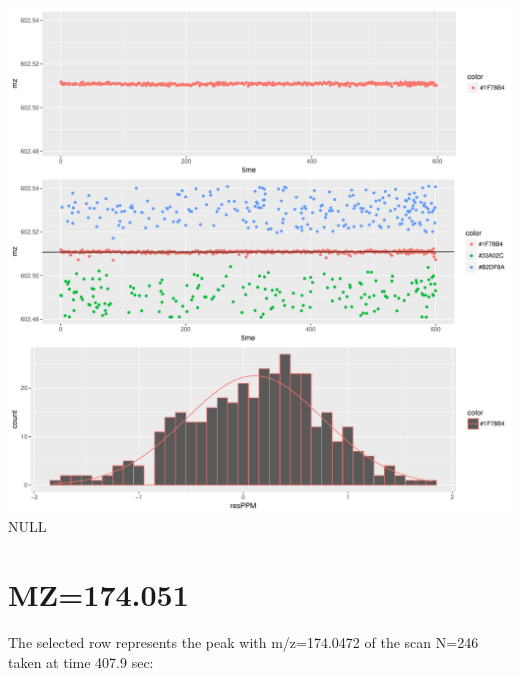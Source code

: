 \documentclass[]{article}
\newenvironment{Shaded}{\begin{snugshade}}{\end{snugshade}}
\newcommand{\KeywordTok}[1]{\textcolor[rgb]{0.13,0.29,0.53}{\textbf{#1}}}
\newcommand{\FloatTok}[1]{\textcolor[rgb]{0.00,0.00,0.81}{#1}}
\newcommand{\OperatorTok}[1]{\textcolor[rgb]{0.81,0.36,0.00}{\textbf{#1}}}
\newcommand{\NormalTok}[1]{#1}
\begin{document}
\includegraphics{Supplementary_document_files/figure-latex/filter.lm.602-1.pdf}
NULL

\section{MZ=174.051}\label{mz174.051}

\begin{Shaded}
\end{Shaded}

The selected row represents the peak with m/z=174.0472 of the scan N=246
taken at time 407.9 sec:

\begin{Shaded}
\end{Shaded}
\end{document}
